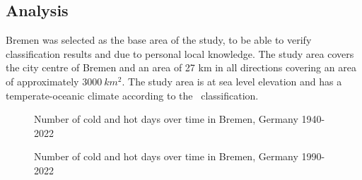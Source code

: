 \documentclass[12pt,a4paper, english,twoside]{scrartcl}
\begin{document}
    \subsection{Analysis}\label{sec:tempanalysis}
      Bremen was selected as the base area of the study, to be able to verify classification results and due to personal local knowledge. 
      The study area covers the city centre of Bremen and an area of 27 km in all directions covering an area of approximately $3000\ km^2$. 
      The study area is at sea level elevation and has a temperate-oceanic climate according to the~\autocite{koppen1930handbuch} classification.%
\newpage
\begin{landscape}
      \begin{figure}[!p]
          
        \caption{Number of cold and hot days over time in Bremen, Germany 1940-2022\label{fig:breTempExtr1}}
      \end{figure}
\end{landscape}
\begin{landscape}
      \begin{figure}[!p]
           
           \caption{Number of cold and hot days over time in Bremen, Germany 1990-2022\label{fig:breTempExtr2}}
      \end{figure}
\end{landscape}
\end{document}
